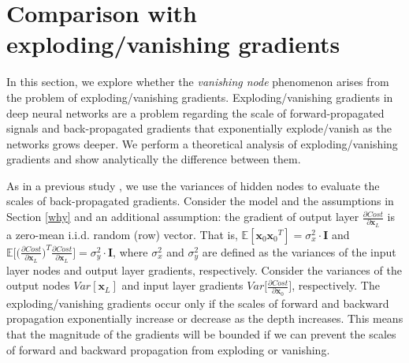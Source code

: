 \chapter{Comparison with exploding/vanishing gradients} \label{compare}

In this section, we explore whether the \textit{vanishing node} phenomenon arises from the problem of  exploding/vanishing gradients. Exploding/vanishing gradients in deep neural networks are a problem regarding the scale of forward-propagated signals and back-propagated gradients that exponentially explode/vanish as the networks grows deeper. We perform a theoretical analysis of exploding/vanishing gradients and show analytically the difference between them.



As in a previous study \cite{xavier}, we use the variances of hidden nodes to evaluate the scales of back-propagated gradients. Consider the model and the assumptions in Section \ref{why} and an additional assumption: the gradient of output layer $\frac{\partial Cost}{\partial \mathbf{x}_L}$ is a zero-mean i.i.d. random (row) vector.
That is, $\mathbb{E}[\mathbf{x}_0{\mathbf{x}_0}^T] = \sigma_x^2\cdot\mathbf{I}$ and $\mathbb{E}\Big[\Big(\frac{\partial Cost}{\partial \mathbf{x}_L}\Big)^T\frac{\partial Cost}{\partial \mathbf{x}_L}\Big] = \sigma_y^2\cdot\mathbf{I}$,
where $\sigma_x^2$ and $\sigma_y^2$ are defined as the variances of the input layer nodes and output layer gradients, respectively.
Consider %
the variances of the output nodes $Var[\mathbf{x}_L]$ and input layer gradients $Var\Big[\frac{\partial Cost}{\partial \mathbf{x}_0}\Big]$, respectively.
The exploding/vanishing gradients  occur only if the scales of forward and backward propagation exponentially increase or decrease as the depth increases.
This means that the magnitude of the gradients will be bounded if we can prevent the scales of forward and backward propagation from exploding or vanishing. 

